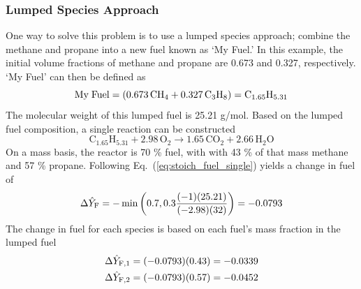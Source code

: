 \subsubsection{Lumped Species Approach}
One way to solve this problem is to use a lumped species approach; combine the methane and propane into a new fuel known as `My Fuel.' In this example, the initial volume fractions of methane and propane are 0.673 and 0.327, respectively. `My Fuel' can then be defined as
\begin{equation}\label{eq:my_fuel}
\rm{My\;Fuel} = \left( 0.673\, \mathrm{CH_4} + 0.327\, \mathrm{C_3H_8} \right) = C_{1.65}H_{5.31}
\end{equation} 
The molecular weight of this lumped fuel is 25.21 g/mol. Based on the lumped fuel composition, a single reaction can be constructed
\begin{equation}\label{eq:lumped_reac}
\mathrm{C_{1.65}H_{5.31} + 2.98 \, O_2} \rightarrow  \mathrm{1.65 \, CO_2 + 2.66 \, H_2O}
\end{equation}
On a mass basis, the reactor is 70 \% fuel, with with 43 \% of that mass methane and 57 \% propane. Following Eq.~(\ref{eq:stoich_fuel_single}) yields a change in fuel of
\begin{equation}\label{eq:bc_delf_lump}
\Delta \hat{Y}_{\rm F} = -\min \left( 0.7, 0.3 \frac{(-1)(25.21)}{(-2.98)(32)}\right) = -0.0793
\end{equation}
The change in fuel for each species is based on each fuel's mass fraction in the lumped fuel
\begin{align}
\Delta \hat{Y}_{\rm F,1} &= (-0.0793)(0.43) = -0.0339 \label{eq:change_reac_lump1} \\
\Delta \hat{Y}_{\rm F,2} &= (-0.0793)(0.57) = -0.0452 \label{eq:change_reac_lump2}
\end{align}

